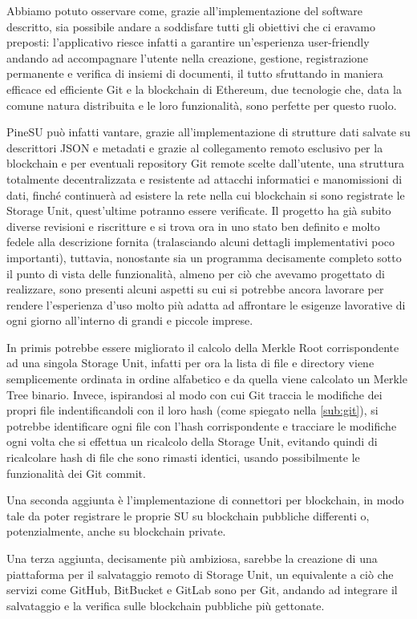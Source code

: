 \label{cap:sf}
Abbiamo potuto osservare come, grazie all’implementazione del software descritto,
sia possibile andare a soddisfare tutti gli obiettivi che ci eravamo preposti:
l’applicativo riesce infatti a garantire un’esperienza user-friendly andando ad 
accompagnare l’utente nella 
creazione, gestione, registrazione permanente e verifica di insiemi di documenti,
il tutto sfruttando in maniera efficace ed efficiente Git e la blockchain di Ethereum,
due tecnologie che, data la comune natura distribuita e le loro funzionalità,
sono perfette per questo ruolo.

PineSU può infatti vantare, grazie all’implementazione di strutture dati salvate
su descrittori JSON e metadati e grazie al collegamento remoto esclusivo per la blockchain
e per eventuali repository Git remote scelte dall’utente, una struttura totalmente
decentralizzata e resistente ad attacchi informatici e manomissioni di dati,
finché continuerà ad esistere la rete nella cui blockchain si sono registrate
le Storage Unit, quest’ultime potranno essere verificate.
Il progetto ha già subito diverse revisioni e riscritture e si trova ora in uno
stato ben definito e molto fedele alla descrizione fornita
(tralasciando alcuni dettagli implementativi poco importanti), tuttavia,
nonostante sia un programma
decisamente completo sotto il punto di vista delle funzionalità, almeno per ciò che
avevamo progettato di realizzare, sono presenti alcuni aspetti su cui si potrebbe
ancora lavorare per rendere l’esperienza d’uso molto più adatta ad affrontare le
esigenze lavorative di ogni giorno all’interno di grandi e piccole imprese.

In primis potrebbe essere migliorato il calcolo della Merkle Root corrispondente
ad una singola Storage Unit, infatti per ora la lista di file e directory viene
semplicemente ordinata in ordine alfabetico e da quella viene calcolato
un Merkle Tree binario. Invece, ispirandosi al modo con cui Git traccia le modifiche
dei propri file indentificandoli con il loro hash (come spiegato nella \autoref{sub:git}),
si potrebbe identificare ogni file con l’hash corrispondente e tracciare le modifiche ogni
volta che si effettua un ricalcolo della Storage Unit, evitando quindi di ricalcolare hash
di file che sono rimasti identici, usando possibilmente le funzionalità dei Git commit.

Una seconda aggiunta è l’implementazione di connettori per blockchain, in modo tale
da poter registrare le proprie SU su blockchain pubbliche differenti o, potenzialmente,
anche su blockchain private.

Una terza aggiunta, decisamente più ambiziosa, sarebbe la creazione di una piattaforma
per il salvataggio remoto di Storage Unit, un equivalente a ciò che servizi come GitHub,
BitBucket e GitLab sono per Git, andando ad integrare il salvataggio e la verifica sulle
blockchain pubbliche più gettonate.